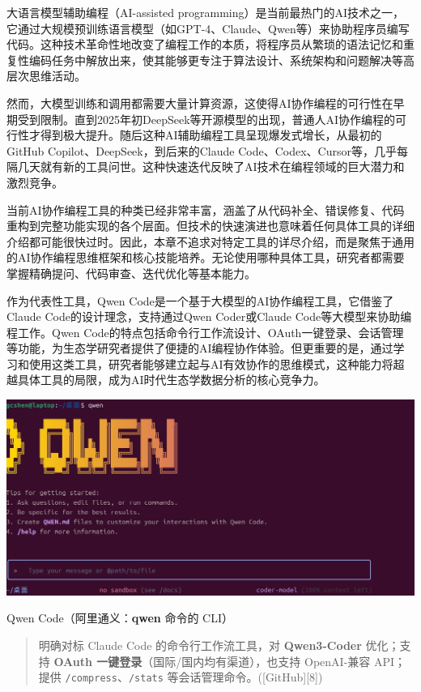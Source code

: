 \documentclass[
  twoside]{book}
\begin{document}
大语言模型辅助编程（AI-assisted programming）是当前最热门的AI技术之一，它通过大规模预训练语言模型（如GPT-4、Claude、Qwen等）来协助程序员编写代码。这种技术革命性地改变了编程工作的本质，将程序员从繁琐的语法记忆和重复性编码任务中解放出来，使其能够更专注于算法设计、系统架构和问题解决等高层次思维活动。

然而，大模型训练和调用都需要大量计算资源，这使得AI协作编程的可行性在早期受到限制。直到2025年初DeepSeek等开源模型的出现，普通人AI协作编程的可行性才得到极大提升。随后这种AI辅助编程工具呈现爆发式增长，从最初的GitHub Copilot、DeepSeek，到后来的Claude Code、Codex、Cursor等，几乎每隔几天就有新的工具问世。这种快速迭代反映了AI技术在编程领域的巨大潜力和激烈竞争。

当前AI协作编程工具的种类已经非常丰富，涵盖了从代码补全、错误修复、代码重构到完整功能实现的各个层面。但技术的快速演进也意味着任何具体工具的详细介绍都可能很快过时。因此，本章不追求对特定工具的详尽介绍，而是聚焦于通用的AI协作编程思维框架和核心技能培养。无论使用哪种具体工具，研究者都需要掌握精确提问、代码审查、迭代优化等基本能力。

作为代表性工具，Qwen Code是一个基于大模型的AI协作编程工具，它借鉴了Claude Code的设计理念，支持通过Qwen Coder或Claude Code等大模型来协助编程工作。Qwen Code的特点包括命令行工作流设计、OAuth一键登录、会话管理等功能，为生态学研究者提供了便捷的AI编程协作体验。但更重要的是，通过学习和使用这类工具，研究者能够建立起与AI有效协作的思维模式，这种能力将超越具体工具的局限，成为AI时代生态学数据分析的核心竞争力。

\includegraphics{imgs/qwen-code.jpg}

Qwen Code（阿里通义：\textbf{qwen} 命令的 CLI）

\begin{quote}
明确对标 Claude Code 的命令行工作流工具，对 \textbf{Qwen3-Coder} 优化；支持 \textbf{OAuth 一键登录}（国际/国内均有渠道），也支持 OpenAI-兼容 API；提供 \texttt{/compress}、\texttt{/stats} 等会话管理命令。({[}GitHub{]}{[}8{]})
\end{quote}
\end{document}
